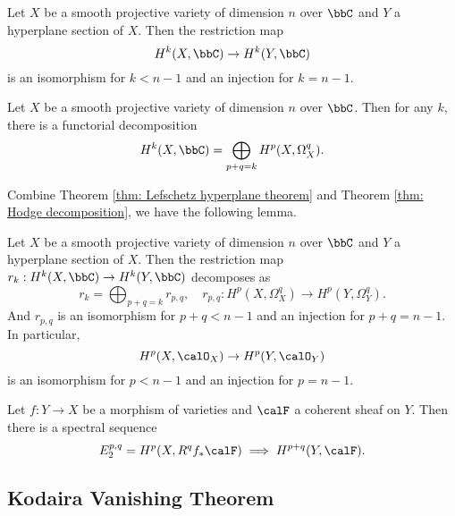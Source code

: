    \begin{theorem}\label{thm: Lefschetz hyperplane theorem}
        Let \(X\) be a smooth projective variety of dimension \(n\) over \(\bbC\) and \(Y\) a hyperplane section of \(X\).
        Then the restriction map
        \[
            H^k(X,\bbC) \to H^k(Y, \bbC)
        \]
        is an isomorphism for \(k < n - 1\) and an injection for \(k = n - 1\).
    \end{theorem}

    \begin{theorem}\label{thm: Hodge decomposition}
        Let \(X\) be a smooth projective variety of dimension \(n\) over \(\bbC\).
        Then for any \(k\), there is a functorial decomposition
        \[
            H^k(X, \bbC) = \bigoplus_{p+q=k} H^{p}(X, \Omega^q_X).
        \]
    \end{theorem}

    Combine Theorem \ref{thm: Lefschetz hyperplane theorem} and Theorem \ref{thm: Hodge decomposition}, we have the following lemma.

    \begin{lemma}\label{lem: Lefschetz hyperplane theorem for cohomology of structure sheaf}
        Let \(X\) be a smooth projective variety of dimension \(n\) over \(\bbC\) and \(Y\) a hyperplane section of \(X\).
        Then the restriction map \(r_k: H^k(X,\bbC) \to H^k(Y, \bbC)\) decomposes as 
        \[
            r_k = \bigoplus_{p+q=k} r_{p,q},\quad r_{p,q}: H^{p}(X, \Omega^q_X) \to H^{p}(Y, \Omega^q_Y).
        \]
        And \(r_{p,q}\) is an isomorphism for \(p + q < n - 1\) and an injection for \(p + q = n - 1\).
        In particular, 
        \[ H^p(X, \calO_X) \to H^p(Y, \calO_Y) \]
        is an isomorphism for \(p < n - 1\) and an injection for \(p = n - 1\).
    \end{lemma}

    \begin{theorem}\label{thm: Leray spectral sequence}
        Let \(f: Y \to X\) be a morphism of varieties and \(\calF\) a coherent sheaf on \(Y\).
        Then there is a spectral sequence
        \[
            E_2^{p,q} = H^p(X, R^q f_* \calF) \implies H^{p+q}(Y, \calF).
        \]
    \end{theorem}
        

\subsection{Kodaira Vanishing Theorem}


